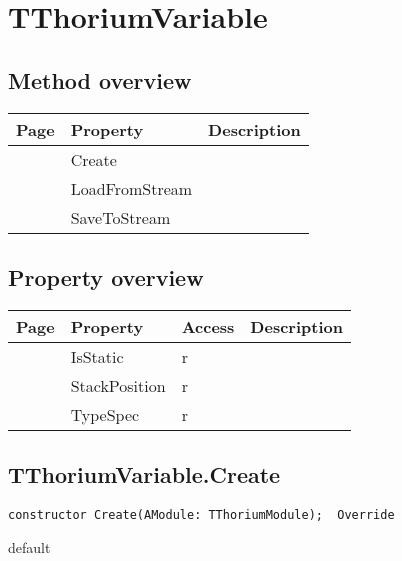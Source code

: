 \section{TThoriumVariable}
\label{thoriumcore:thorium:tthoriumvariable}
\subsection{Method overview}
\label{thoriumcore:thorium:tthoriumvariable:methods}
\begin{tabularx}{\textwidth}{llX}
Page & Property & Description  \\ \hline
\pageref{thoriumcore:thorium:tthoriumvariable:create} & Create  &  \\
\pageref{thoriumcore:thorium:tthoriumvariable:loadfromstream} & LoadFromStream  &  \\
\pageref{thoriumcore:thorium:tthoriumvariable:savetostream} & SaveToStream  &  \\
\hline
\end{tabularx}
\subsection{Property overview}
\label{thoriumcore:thorium:tthoriumvariable:properties}
\begin{tabularx}{\textwidth}{lllX}
Page & Property & Access & Description \\ \hline
\pageref{thoriumcore:thorium:tthoriumvariable:isstatic} & IsStatic & r &  \\
\pageref{thoriumcore:thorium:tthoriumvariable:stackposition} & StackPosition & r &  \\
\pageref{thoriumcore:thorium:tthoriumvariable:typespec} & TypeSpec & r &  \\
\hline
\end{tabularx}
\subsection{TThoriumVariable.Create}
\label{thoriumcore:thorium:tthoriumvariable:create}
\begin{FPCList}
\Synopsis
\Declaration 

\begin{verbatim}
constructor Create(AModule: TThoriumModule);  Override
\end{verbatim}
\Visibility
default
\Description
\Errors
\end{FPCList}
